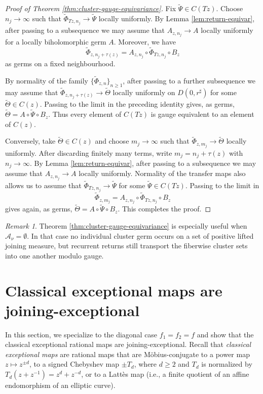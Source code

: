 \documentclass[11pt]{amsart}
\numberwithin{equation}{section}
\theoremstyle{plain}
\theoremstyle{definition}
\theoremstyle{remark}
\newtheorem{rmk}[thm]{Remark}
\begin{document}
\begin{proof}[Proof of Theorem \ref{thm:cluster-gauge-equivariance}]
Fix $\widetilde\Psi\in C(Tz)$.
Choose $n_j\to\infty$ such that
$\widetilde\Phi_{Tz,n_j}\to\widetilde\Psi$ locally uniformly. By
Lemma \ref{lem:return-equivar}, after passing to a subsequence we may
assume that
$A_{z,n_j}\to A$ locally uniformly for a locally biholomorphic germ
$A$. Moreover, we have
$$
\widetilde\Phi_{z,n_j+\tau(z)}
=
A_{z,n_j}\circ
\widetilde\Phi_{Tz,n_j}\circ B_z
$$
as germs on a fixed neighbourhood.

By normality of the family
$\{\widetilde\Phi_{z,n}\}_{n\geq1}$, after passing to a further
subsequence we may assume that
$
\widetilde\Phi_{z,n_j+\tau(z)}
\to\widetilde\Theta
$
locally uniformly on $D(0,r^\sharp)$ for some
$\widetilde\Theta\in C(z)$. Passing to the limit in the preceding
identity gives, as germs,
$\widetilde\Theta
=
A\circ\widetilde\Psi\circ B_z$.
Thus every element of $C(Tz)$ is gauge equivalent to an element of
$C(z)$.

Conversely, take $\widetilde\Theta\in C(z)$ and choose
$m_j\to\infty$ such that
$\widetilde\Phi_{z,m_j}\to\widetilde\Theta$ locally uniformly.
After discarding finitely many terms, write
$m_j=n_j+\tau(z)$ with $n_j\to\infty$.
By Lemma \ref{lem:return-equivar}, after passing to a subsequence we
may assume that $A_{z,n_j}\to A$ locally uniformly. Normality of the
transfer maps also allows us to assume that
$
\widetilde\Phi_{Tz,n_j}
\to
\widetilde\Psi
$
for some $\widetilde\Psi\in C(Tz)$. Passing to the limit in
$$
\widetilde\Phi_{z,m_j}
=
A_{z,n_j}\circ
\widetilde\Phi_{Tz,n_j}\circ B_z
$$
gives again, as germs,
$
\widetilde\Theta
=
A\circ\widetilde\Psi\circ B_z.
$
This completes the proof.
\end{proof}

\begin{rmk}\label{rmk:gauge-empty-Anu}
Theorem \ref{thm:cluster-gauge-equivariance} is especially useful
when $\mathcal A_\nu=\emptyset$. In that case no individual cluster
germ occurs on a set of positive lifted joining measure, but recurrent
returns still transport the fiberwise cluster sets into one another
modulo gauge.
\end{rmk}


\section{Classical exceptional maps are joining-exceptional}
\label{sec:classical-ex-maps}
In this section, we specialize to the diagonal case
$f_1=f_2=f$ and show that the classical exceptional rational maps
are joining-exceptional. Recall that {\it classical
exceptional maps} are
rational maps that are M\"obius-conjugate to a power
map $z\mapsto z^{\pm d}$, to a signed Chebyshev map $\pm T_d$,
where $d\geq2$ and $T_d$ is normalized by
$T_d(z+z^{-1})=z^d+z^{-d}$,
or to a Latt\`es map
(i.e.,
a finite quotient of an affine
endomorphism of an elliptic curve).
\end{document}

